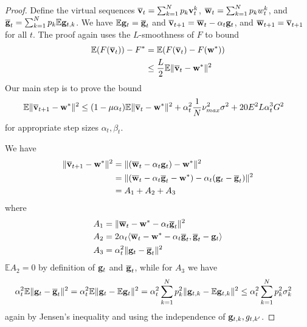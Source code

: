 \begin{proof}
Define the virtual sequences ${\overline{\mathbf{v}}}_{t}=\sum_{k=1}^{N}p_{k}{\mathbf{v}}_{t}^{k}$,
${\overline{\mathbf{w}}}_{t}=\sum_{k=1}^{N}p_{k}w_{t}^{k}$, and ${\overline{\mathbf{g}}}_{t}=\sum_{k=1}^{N}p_{k}\mathbb{E}{\mathbf{g}}_{t,k}$.
We have $\mathbb{E}{\mathbf{g}}_{t}={\overline{\mathbf{g}}}_{t}$ and ${\overline{\mathbf{v}}}_{t+1}={\overline{\mathbf{w}}}_{t}-\alpha_{t}{\mathbf{g}}_{t}$,
and ${\overline{\mathbf{w}}}_{t+1}={\overline{\mathbf{v}}}_{t+1}$ for all $t$. The proof
again uses the $L$-smoothness of $F$ to bound 
\begin{align*}
\mathbb{E}(F({\overline{\mathbf{v}}}_{t}))-F^{\ast} & =\mathbb{E}(F({\overline{\mathbf{v}}}_{t})-F({\mathbf{w}}^{\ast}))\\
& \leq\frac{L}{2}\mathbb{E}\|{\overline{\mathbf{v}}}_{t}-{\mathbf{w}}^{\ast}\|^{2}
\end{align*}
Our main step is to prove the bound
\begin{align*}
\mathbb{E}\|{\overline{\mathbf{v}}}_{t+1}-{\mathbf{w}}^{\ast}\|^{2} & \leq(1-\mu\alpha_{t})\mathbb{E}\|{\overline{\mathbf{v}}}_{t}-{\mathbf{w}}^{\ast}\|^{2}+\alpha_{t}^{2}\frac{1}{N}\nu_{max}^{2}\sigma^{2}+20E^{2}L\alpha_{t}^{3}G^{2}
\end{align*}
 for appropriate step sizes $\alpha_{t},\beta_{t}$.

We have 
\begin{align*}
\|{\overline{\mathbf{v}}}_{t+1}-{\mathbf{w}}^{\ast}\|^{2} & =\|({\overline{\mathbf{w}}}_{t}-\alpha_{t}{\mathbf{g}}_{t})-{\mathbf{w}}^{\ast}\|^{2}\\
& =\|({\overline{\mathbf{w}}}_{t}-\alpha_{t}{\overline{\mathbf{g}}}_{t}-{\mathbf{w}}^{\ast})-\alpha_{t}({\mathbf{g}}_{t}-{\overline{\mathbf{g}}}_{t})\|^{2}\\
& =A_{1}+A_{2}+A_{3}
\end{align*}
where 
\begin{align*}
A_{1} & =\|{\overline{\mathbf{w}}}_{t}-{\mathbf{w}}^{\ast}-\alpha_{t}{\overline{\mathbf{g}}}_{t}\|^{2}\\
A_{2} & =2\alpha_{t}\langle{\overline{\mathbf{w}}}_{t}-{\mathbf{w}}^{\ast}-\alpha_{t}{\overline{\mathbf{g}}}_{t},{\overline{\mathbf{g}}}_{t}-{\mathbf{g}}_{t}\rangle\\
A_{3} & =\alpha_{t}^{2}\|{\mathbf{g}}_{t}-{\overline{\mathbf{g}}}_{t}\|^{2}
\end{align*}
$\mathbb{E}A_{2}=0$ by definition of ${\mathbf{g}}_{t}$ and ${\overline{\mathbf{g}}}_{t}$,
while for $A_{3}$ we have
\begin{align*}
\alpha_{t}^{2}\mathbb{E}\|{\mathbf{g}}_{t}-{\overline{\mathbf{g}}}_{t}\|^{2} & =\alpha_{t}^{2}\mathbb{E}\|{\mathbf{g}}_{t}-\mathbb{E}{\mathbf{g}}_{t}\|^{2}=\alpha_{t}^{2}\sum_{k=1}^{N}p_{k}^{2}\|{\mathbf{g}}_{t,k}-\mathbb{E}{\mathbf{g}}_{t,k}\|^{2}\leq\alpha_{t}^{2}\sum_{k=1}^{N}p_{k}^{2}\sigma_{k}^{2}
\end{align*}
again by Jensen's inequality and using the independence of ${\mathbf{g}}_{t,k},g_{t,k'}$. 


\end{proof}
